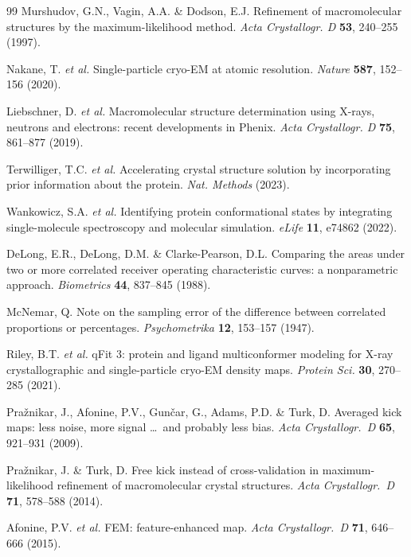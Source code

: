 \documentclass[10pt,twocolumn]{article}
\begin{document}
\begin{thebibliography}{99}
Murshudov, G.N., Vagin, A.A. \& Dodson, E.J.
Refinement of macromolecular structures by the
maximum-likelihood method.
\textit{Acta Crystallogr. D} \textbf{53}, 240--255 (1997).

Nakane, T. \textit{et al.}
Single-particle cryo-EM at atomic resolution.
\textit{Nature} \textbf{587}, 152--156 (2020).

Liebschner, D. \textit{et al.}
Macromolecular structure determination using X-rays, neutrons
and electrons: recent developments in Phenix.
\textit{Acta Crystallogr. D} \textbf{75}, 861--877 (2019).

Terwilliger, T.C. \textit{et al.}
Accelerating crystal structure solution by incorporating
prior information about the protein.
\textit{Nat. Methods} (2023).

Wankowicz, S.A. \textit{et al.}
Identifying protein conformational states by integrating
single-molecule spectroscopy and molecular simulation.
\textit{eLife} \textbf{11}, e74862 (2022).

DeLong, E.R., DeLong, D.M. \& Clarke-Pearson, D.L.
Comparing the areas under two or more correlated receiver
operating characteristic curves: a nonparametric approach.
\textit{Biometrics} \textbf{44}, 837--845 (1988).

McNemar, Q.
Note on the sampling error of the difference between correlated
proportions or percentages.
\textit{Psychometrika} \textbf{12}, 153--157 (1947).

Riley, B.T. \textit{et al.}
qFit 3: protein and ligand multiconformer modeling for X-ray
crystallographic and single-particle cryo-EM density maps.
\textit{Protein Sci.} \textbf{30}, 270--285 (2021).

Pra\v{z}nikar, J., Afonine, P.V., Gun\v{c}ar, G., Adams, P.D.
\& Turk, D.
Averaged kick maps: less noise, more signal \ldots\ and probably
less bias.
\textit{Acta Crystallogr.\ D} \textbf{65}, 921--931 (2009).

Pra\v{z}nikar, J. \& Turk, D.
Free kick instead of cross-validation in maximum-likelihood
refinement of macromolecular crystal structures.
\textit{Acta Crystallogr.\ D} \textbf{71}, 578--588 (2014).

Afonine, P.V. \textit{et al.}
FEM: feature-enhanced map.
\textit{Acta Crystallogr.\ D} \textbf{71}, 646--666 (2015).


\end{thebibliography}
\end{document}

